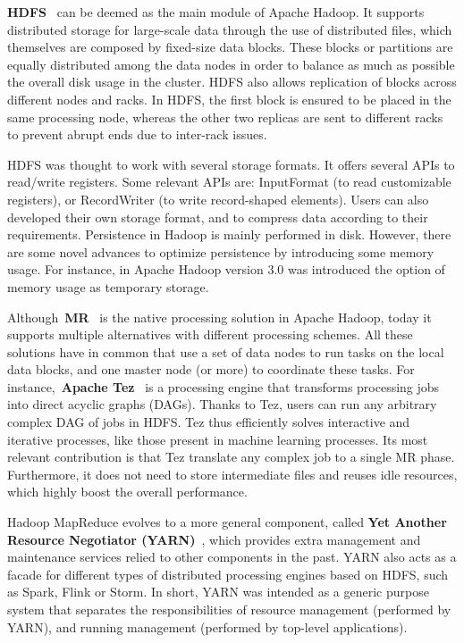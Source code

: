 \documentclass[3p,review]{elsarticle}
\begin{document}
\textbf{HDFS}~\cite{hdfs} can be deemed as the main module of Apache Hadoop. It supports distributed storage for large-scale data through the use of distributed files, which themselves are composed by fixed-size data blocks. These blocks or partitions are equally distributed among the data nodes in order to balance as much as possible the overall disk usage in the cluster. HDFS also allows replication of blocks across different nodes and racks. In HDFS, the first block is ensured to be placed in the same processing node, whereas the other two replicas are sent to different racks to prevent abrupt ends due to inter-rack issues. 

HDFS was thought to work with several storage formats. It offers several APIs to read/write registers. Some relevant APIs are: InputFormat (to read customizable registers), or RecordWriter (to write record-shaped elements). Users can also developed their own storage format, and to compress data according to their requirements. Persistence in Hadoop is mainly performed in disk. However, there are some novel advances to optimize persistence by introducing some memory usage. For instance, in Apache Hadoop version 3.0 was introduced the option of memory usage as temporary storage.

Although~\textbf{MR}~\cite{dean04} is the native processing solution in Apache Hadoop, today it supports multiple alternatives with different processing schemes. All these solutions have in common that use a set of data nodes to run tasks on the local data blocks, and one master node (or more) to coordinate these tasks. For instance,~\textbf{Apache Tez}~\cite{tez} is a processing engine that transforms processing jobs into direct acyclic graphs (DAGs). Thanks to Tez, users can run any arbitrary complex DAG of jobs in HDFS. Tez thus efficiently solves interactive and iterative processes, like those present in machine learning processes. Its most relevant contribution is that Tez translate any complex job to a single MR phase. Furthermore, it does not need to store intermediate files and reuses idle resources, which highly boost the overall performance.

Hadoop MapReduce evolves to a more general component, called \textbf{Yet Another Resource Negotiator (YARN)}~\cite{yarn}, which provides extra management and maintenance services relied to other components in the past. YARN also acts as a facade for different types of distributed processing engines based on HDFS, such as Spark, Flink or Storm. In short, YARN was intended as a generic purpose system that separates the responsibilities of resource management (performed by YARN), and running management (performed by top-level applications).
\end{document}
